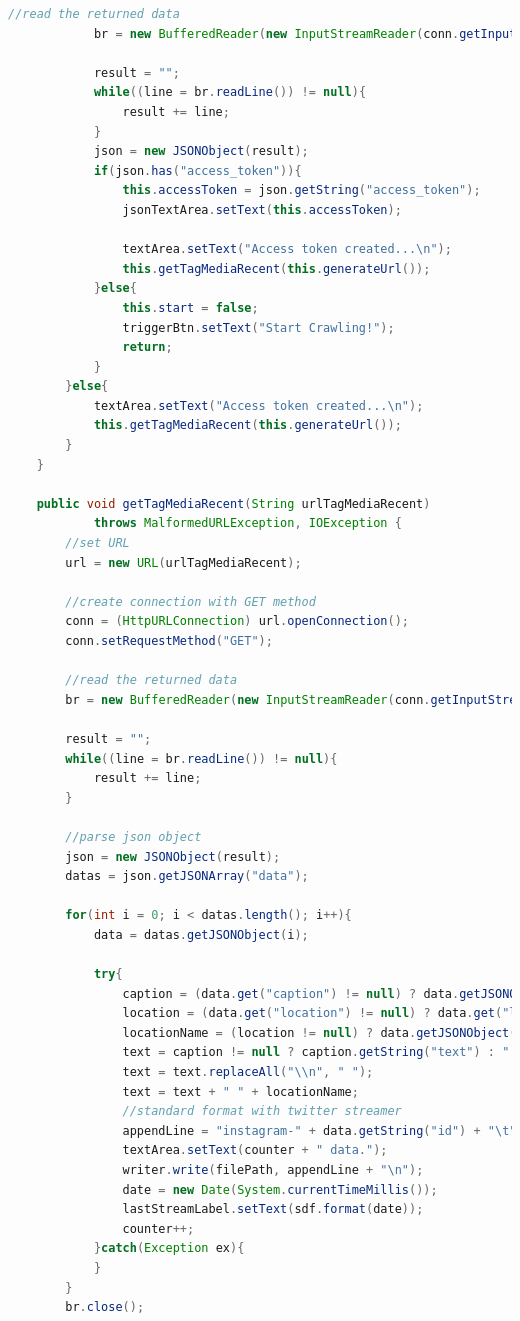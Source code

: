\begin{lstlisting}[language=Java,basicstyle=\tiny,caption=TwitterStreamer.java,label={lst:kode_instagram_crawler}]
            //read the returned data
            br = new BufferedReader(new InputStreamReader(conn.getInputStream()));

            result = "";
            while((line = br.readLine()) != null){
                result += line;
            }
            json = new JSONObject(result);
            if(json.has("access_token")){
                this.accessToken = json.getString("access_token");
                jsonTextArea.setText(this.accessToken); 
                
                textArea.setText("Access token created...\n");
                this.getTagMediaRecent(this.generateUrl());
            }else{
                this.start = false;
                triggerBtn.setText("Start Crawling!");
                return;
            }
        }else{
            textArea.setText("Access token created...\n");
            this.getTagMediaRecent(this.generateUrl());
        }
    }
    
    public void getTagMediaRecent(String urlTagMediaRecent) 
            throws MalformedURLException, IOException {
        //set URL
        url = new URL(urlTagMediaRecent);

        //create connection with GET method
        conn = (HttpURLConnection) url.openConnection();
        conn.setRequestMethod("GET");

        //read the returned data
        br = new BufferedReader(new InputStreamReader(conn.getInputStream()));

        result = "";
        while((line = br.readLine()) != null){
            result += line;
        }

        //parse json object
        json = new JSONObject(result);
        datas = json.getJSONArray("data");

        for(int i = 0; i < datas.length(); i++){
            data = datas.getJSONObject(i);

            try{
                caption = (data.get("caption") != null) ? data.getJSONObject("caption") : null;
                location = (data.get("location") != null) ? data.get("location").toString() : null;
                locationName = (location != null) ? data.getJSONObject("location").getString("name") : "";
                text = caption != null ? caption.getString("text") : " ";
                text = text.replaceAll("\\n", " ");
                text = text + " " + locationName;
                //standard format with twitter streamer
                appendLine = "instagram-" + data.getString("id") + "\t" + text + "\t instagram \t" + location + "\t" + data.getString("created_time") + "000\t";
                textArea.setText(counter + " data.");
                writer.write(filePath, appendLine + "\n");
                date = new Date(System.currentTimeMillis());
                lastStreamLabel.setText(sdf.format(date));
                counter++;
            }catch(Exception ex){
            }
        }
        br.close();


\end{lstlisting}
